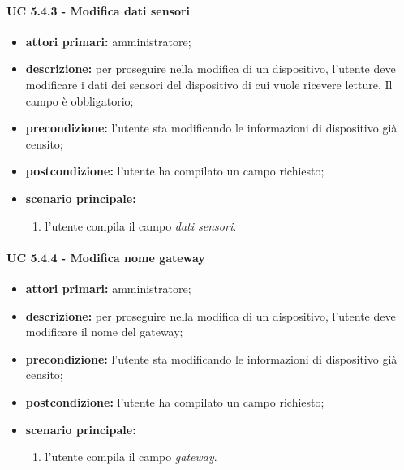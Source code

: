 				\paragraph{UC 5.4.3 - Modifica dati sensori}
				\begin{itemize}
					\item \textbf{attori primari:} amministratore;
					\item \textbf{descrizione:} per proseguire nella modifica di un dispositivo, l'utente deve modificare i dati dei sensori del dispositivo di cui vuole ricevere letture. Il campo è obbligatorio;
					\item \textbf{precondizione:} l'utente sta modificando le informazioni di dispositivo già censito;
					\item \textbf{postcondizione:} l'utente ha compilato un campo richiesto;
					\item \textbf{scenario principale:}
					\begin{enumerate}
						\item{l'utente compila il campo \textit{dati sensori}.}
					\end{enumerate}
				\end{itemize}

				\paragraph{UC 5.4.4 - Modifica nome gateway}
				\begin{itemize}
					\item \textbf{attori primari:} amministratore;
					\item \textbf{descrizione:} per proseguire nella modifica di un dispositivo, l'utente deve modificare il nome del gateway;
					\item \textbf{precondizione:} l'utente sta modificando le informazioni di dispositivo già censito;
					\item \textbf{postcondizione:} l'utente ha compilato un campo richiesto;
					\item \textbf{scenario principale:}
					\begin{enumerate}
						\item{l'utente compila il campo \textit{gateway}.}
					\end{enumerate}
				\end{itemize}

